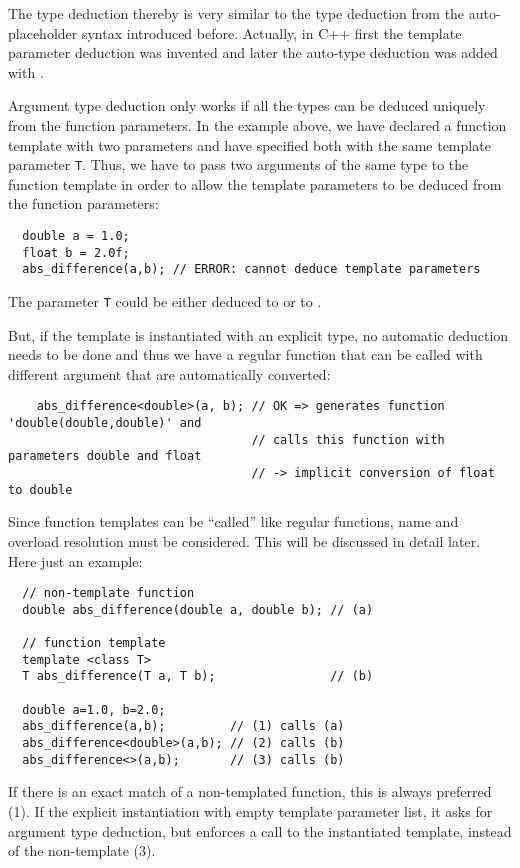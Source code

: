 The type deduction thereby is very similar to the  type deduction from the auto-placeholder syntax introduced before.
Actually, in C++ first the template parameter deduction was invented and later the auto-type deduction was added with .

\begin{rem}
  Argument type deduction only works if all the types can be deduced uniquely from the function parameters. In the example above, we have
  declared a function template with two parameters and have specified both with the same template parameter \texttt{T}. Thus, we have to
  pass two arguments of the same type to the function template in order to allow the template parameters to be deduced from the
  function parameters:
  \begin{verbatim}
  double a = 1.0;
  float b = 2.0f;
  abs_difference(a,b); // ERROR: cannot deduce template parameters
  \end{verbatim}
  The parameter \texttt{T} could be either deduced to  or to .

  But, if the template is instantiated with an explicit type, no automatic deduction needs to be done and thus we have a regular
  function that can be called with different argument that are automatically converted:
  \begin{verbatim}
    abs_difference<double>(a, b); // OK => generates function 'double(double,double)' and
                                  // calls this function with parameters double and float
                                  // -> implicit conversion of float to double
  \end{verbatim}
\end{rem}

Since function templates can be ``called'' like regular functions, name and overload resolution must be considered. This will be discussed in detail
later. Here just an example:
\begin{verbatim}
  // non-template function
  double abs_difference(double a, double b); // (a)

  // function template
  template <class T>
  T abs_difference(T a, T b);                // (b)

  double a=1.0, b=2.0;
  abs_difference(a,b);         // (1) calls (a)
  abs_difference<double>(a,b); // (2) calls (b)
  abs_difference<>(a,b);       // (3) calls (b)
\end{verbatim}
If there is an exact match of a non-templated function, this is always preferred (1). If the explicit instantiation with empty template parameter list,
it asks for argument type deduction, but enforces a call to the instantiated template, instead of the non-template (3).



